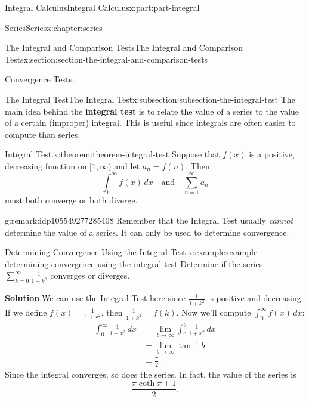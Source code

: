 \documentclass[twoside,10pt,]{book}
\newcommand{\blocktitlefont}{\relax}
\newcommand{\terminology}[1]{\textbf{#1}}
\numberwithin{equation}{part}
\newcommand{\amp}{&}
\begin{document}
\begin{partptx}{Integral Calculus}{}{Integral Calculus}{}{}{x:part:part-integral}
\begin{chapterptx}{Series}{}{Series}{}{}{x:chapter:series}
\begin{sectionptx}{The Integral and Comparison Tests}{}{The Integral and Comparison Tests}{}{}{x:section:section-the-integral-and-comparison-tests}
\begin{introduction}{Convergence Tests.}
\end{introduction}%
%
%
\typeout{************************************************}
\typeout{************************************************}
%
\begin{subsectionptx}{The Integral Test}{}{The Integral Test}{}{}{x:subsection:subsection-the-integral-test}
The main idea behind the \terminology{integral test} is to relate the value of a series to the value of a certain (improper) integral. This is useful since integrals are often easier to compute than series.%
\begin{theorem}{Integral Test.}{}{x:theorem:theorem-integral-test}%
Suppose that \(f(x)\) is a positive, decreasing function on \([1,\infty)\) and let \(a_{n} = f(n)\). Then%
\begin{equation*}
\int_{1}^{\infty}f(x)\,dx\quad\text{and}\quad \sum_{n=1}^{\infty}a_{n}
\end{equation*}
must both converge or both diverge.%
\end{theorem}
\begin{remark}{}{g:remark:idp105549277285408}%
Remember that the Integral Test usually \emph{cannot} determine the value of a series. It can only be used to determine convergence.%
\end{remark}
\begin{example}{Determining Convergence Using the Integral Test.}{x:example:example-determining-convergence-using-the-integral-test}%
Determine if the series \(\sum_{k=0}^{\infty}\frac{1}{1 + k^{2}}\) converges or diverges.%
\par\smallskip%
\noindent\textbf{\blocktitlefont Solution}.\hypertarget{g:solution:idp105549277287456}{}\quad{}We can use the Integral Test here since \(\frac{1}{1 + k^{2}}\) is positive and decreasing. If we define \(f(x) = \frac{1}{1 + x^{2}}\), then \(\frac{1}{1 + k^{2}} = f(k)\). Now we'll compute \(\int_{0}^{\infty}f(x)\,dx\):%
\begin{align*}
\int_{0}^{\infty}\frac{1}{1 + x^{2}}\,dx \amp = \lim_{b\to\infty}\int_{0}^{b}\frac{1}{1 + x^{2}}\,dx \\
\amp = \lim_{b\to\infty}\tan^{-1}b \\
\amp = \frac{\pi}{2} \text{.}
\end{align*}
Since the integral converges, so does the series. In fact, the value of the series is%
\begin{equation*}
\frac{\pi\coth\pi + 1}{2}\text{.}
\end{equation*}
%
\end{example}

\end{subsectionptx}
\end{sectionptx}
\end{chapterptx}
\end{partptx}
\end{document}
